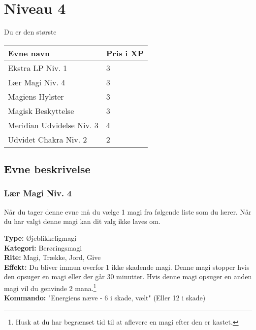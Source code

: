 \chapter{Niveau 4}
Du er den største 

\begin{table}[H]
    \centering
    \begin{tabular}{|p{}|p{}|}
    \rowcolor{cerulean!80}\hline
        Evne navn & Pris i XP \\\hline
        Ekstra LP Niv. 1 & 3 \\\hline
        Lær Magi Niv. 4 & 3 \\\hline
        Magiens Hylster  & 3 \\\hline
        Magisk Beskyttelse & 3\\\hline
        Meridian Udvidelse Niv. 3 & 4 \\\hline
        Udvidet Chakra Niv. 2 & 2 \\\hline
    \end{tabular}
\end{table}

\section{Evne beskrivelse}



\subsection{Lær Magi Niv. 4}
Når du tager denne evne må du vælge 1 magi fra følgende liste som du lærer. Når du har valgt denne magi kan dit valg ikke laves om.

\begin{lærmagi*}
\textbf{Type:} Øjeblikkeligmagi\\
\textbf{Kategori:} Berøringsmagi\\
\textbf{Rite:} Magi, Trække, Jord, Give\\
\textbf{Effekt:} Du bliver immun overfor 1 ikke skadende magi. Denne magi stopper hvis den opsuger en magi eller der går 30 minutter. Hvis denne magi opsuger en anden magi vil du genvinde 2 mana.\footnote{Husk at du har begrænset tid til at aflevere en magi efter den er kastet.}\\
\textbf{Kommando:} "Energiens næve - 6 i skade, vælt" (Eller 12 i skade)\\
\end{lærmagi*}


